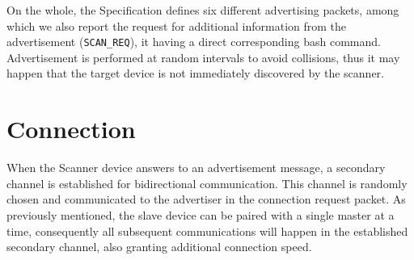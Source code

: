 On the whole, the Specification defines six different advertising packets, among which we also report the request for additional information from the advertisement (\texttt{SCAN\_REQ}), it having a direct corresponding bash command. Advertisement is performed at random intervals to avoid collisions, thus it may happen that the target device is not immediately discovered by the scanner.

\section{Connection} \label{sec:connection}
When the Scanner device answers to an advertisement message, a secondary channel is established for bidirectional communication. This channel is randomly chosen and communicated to the advertiser in the connection request packet. As previously mentioned, the slave device can be paired with a single master at a time, consequently all subsequent communications will happen in the established secondary channel, also granting additional connection speed.

